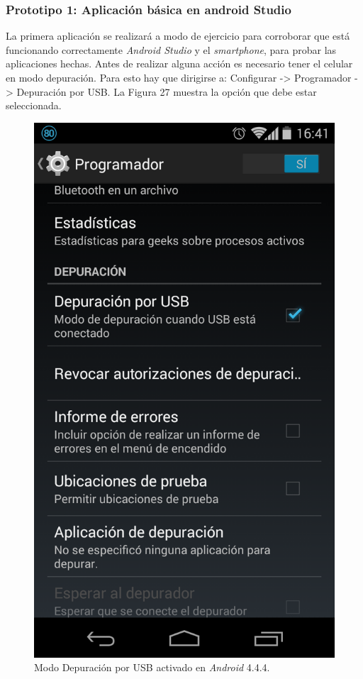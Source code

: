 \subsubsection{Prototipo 1: Aplicación básica en android Studio}

La primera aplicación se realizará a modo de ejercicio para corroborar que está funcionando correctamente \textit{Android Studio} y el \textit{smartphone}, para probar las aplicaciones hechas. Antes de realizar alguna acción es necesario tener el celular en modo depuración. Para esto hay que dirigirse a: Configurar -> Programador -> Depuración por USB. La Figura 27 muestra la opción que debe estar seleccionada.\\

\begin{figure}[H]
\centering
\includegraphics[scale=0.25]{images/capitulo5/modoDepuracion.png}
\caption{Modo Depuración por USB activado en \textit{Android} 4.4.4.}
\label{modoDepuracion}
\end{figure}

